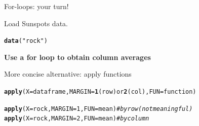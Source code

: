 \documentclass[10pt]{beamer}\usepackage[]{graphicx}\usepackage[]{color}
\makeatletter
\newcommand{\hlnum}[1]{\textcolor[rgb]{0.686,0.059,0.569}{#1}}%
\newcommand{\hlstr}[1]{\textcolor[rgb]{0.192,0.494,0.8}{#1}}%
\newcommand{\hlcom}[1]{\textcolor[rgb]{0.678,0.584,0.686}{\textit{#1}}}%
\newcommand{\hlstd}[1]{\textcolor[rgb]{0.345,0.345,0.345}{#1}}%
\newcommand{\hlkwc}[1]{\textcolor[rgb]{0.333,0.667,0.333}{#1}}%
\newcommand{\hlkwd}[1]{\textcolor[rgb]{0.737,0.353,0.396}{\textbf{#1}}}%
\newenvironment{kframe}{%
 \def\at@end@of@kframe{}%
 \ifinner\ifhmode%
  \def\at@end@of@kframe{\end{minipage}}%
  \begin{minipage}{\columnwidth}%
 \fi\fi%
 \def\FrameCommand##1{\hskip\@totalleftmargin \hskip-\fboxsep
 \colorbox{shadecolor}{##1}\hskip-\fboxsep
     \hskip-\linewidth \hskip-\@totalleftmargin \hskip\columnwidth}%
 \MakeFramed {\advance\hsize-\width
   \@totalleftmargin\z@ \linewidth\hsize
   \@setminipage}}%
 {\par\unskip\endMakeFramed%
 \at@end@of@kframe}
\newenvironment{knitrout}{}{} %
\makeatother
\begin{document}
\begin{frame}[fragile]{For-loops: your turn!}

Load Sunspots data.
\begin{knitrout}
\color{fgcolor}\begin{kframe}
\begin{alltt}
  \hlkwd{data}\hlstd{(}\hlstr{"rock"}\hlstd{)}
\end{alltt}
\end{kframe}
\end{knitrout}
  
  \centering
\textbf{\large Use a for loop to obtain column averages}
  
\end{frame}

\begin{frame}[fragile]{More concise alternative: apply functions}

\begin{knitrout}
\color{fgcolor}\begin{kframe}
\begin{alltt}
\hlkwd{apply}(X = dataframe, MARGIN = \hlkwd{1} (row) or \hlkwd{2} (col), FUN = function)
\end{alltt}
\end{kframe}
\end{knitrout}
  
  \pause
  
\begin{knitrout}
\color{fgcolor}\begin{kframe}
\begin{alltt}
\hlkwd{apply}\hlstd{(}\hlkwc{X} \hlstd{= rock,} \hlkwc{MARGIN} \hlstd{=} \hlnum{1}\hlstd{,} \hlkwc{FUN} \hlstd{= mean)}\hlcom{#by row (not meaningful)}
\hlkwd{apply}\hlstd{(}\hlkwc{X} \hlstd{= rock,} \hlkwc{MARGIN} \hlstd{=} \hlnum{2}\hlstd{,} \hlkwc{FUN} \hlstd{= mean)}\hlcom{#by column}
\end{alltt}
\end{kframe}
\end{knitrout}
\end{frame}
\end{document}
